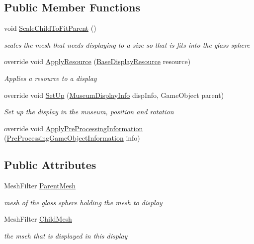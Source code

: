 \subsection*{Public Member Functions}
\begin{DoxyCompactItemize}
\item 
void \mbox{\hyperlink{class_mesh_display_a94176ce6e76cc683336051b49573ab1f}{Scale\+Child\+To\+Fit\+Parent}} ()
\begin{DoxyCompactList}\small\item\em scales the mesh that needs displaying to a size so that is fits into the glass sphere \end{DoxyCompactList}\item 
override void \mbox{\hyperlink{class_mesh_display_ab9a24f407a8ff995658097a98242095e}{Apply\+Resource}} (\mbox{\hyperlink{class_base_display_resource}{Base\+Display\+Resource}} resource)
\begin{DoxyCompactList}\small\item\em Applies a resource to a display \end{DoxyCompactList}\item 
override void \mbox{\hyperlink{class_mesh_display_adb19ca4d076a93df64d1c035663fce0f}{Set\+Up}} (\mbox{\hyperlink{class_museum_display_info}{Museum\+Display\+Info}} disp\+Info, Game\+Object parent)
\begin{DoxyCompactList}\small\item\em Set up the display in the museum, position and rotation \end{DoxyCompactList}\item 
override void \mbox{\hyperlink{class_mesh_display_ab52b4d43c963b3bef383e2eebd1e4115}{Apply\+Pre\+Processing\+Information}} (\mbox{\hyperlink{class_pre_processing_game_object_information}{Pre\+Processing\+Game\+Object\+Information}} info)
\end{DoxyCompactItemize}
\subsection*{Public Attributes}
\begin{DoxyCompactItemize}
\item 
Mesh\+Filter \mbox{\hyperlink{class_mesh_display_a112cd7fd6e19ed52906cbb4240dc6735}{Parent\+Mesh}}
\begin{DoxyCompactList}\small\item\em mesh of the glass sphere holding the mesh to display \end{DoxyCompactList}\item 
Mesh\+Filter \mbox{\hyperlink{class_mesh_display_aef69e30c103e4ccea952b87876384d6d}{Child\+Mesh}}
\begin{DoxyCompactList}\small\item\em the mseh that is displayed in this display \end{DoxyCompactList}\end{DoxyCompactItemize}
